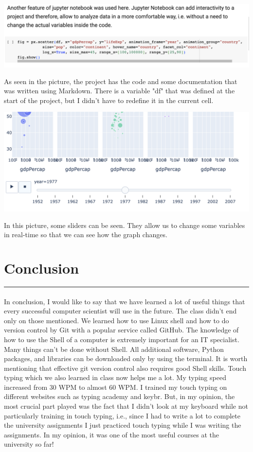 \documentclass[a4paper,11pt]{article}
\newcommand{\sectitle}[1]{
    \vspace{1.5ex}
    \section{#1}
    \vspace{-3ex}
    \noindent\rule{\textwidth}{0.7pt}
    \vspace{-4ex}
}
\begin{document}
\begin{center}
\includegraphics[scale=0.52]{jup1.png}
\end{center}

As seen in the picture, the project has the code and some documentation that was written using Markdown. There is a variable "df" that was defined at the start of the project, but I didn't have to redefine it in the current cell. 

\begin{center}
\includegraphics[scale=0.52]{jup2.png}
\end{center}

In this picture, some sliders can be seen. They allow us to change some variables in real-time so that we can see how the graph changes. 

\sectitle{Conclusion}
\paragraph{}
In conclusion, I would like to say that we have learned a lot of useful things that every successful computer scientist will use in the future. The class didn't end only on those mentioned. We learned how to use Linux shell and how to do version control by Git with a popular service called GitHub. The knowledge of how to use the Shell of a computer is extremely important for an IT specialist. Many things can't be done without Shell. All additional software, Python packages, and libraries can be downloaded only by using the terminal. It is worth mentioning that effective git version control also requires good Shell skills. Touch typing which we also learned in class now helps me a lot. My typing speed increased from 30 WPM to almost 60 WPM. I trained my touch typing on different websites such as typing academy and keybr. But, in my opinion, the most crucial part played was the fact that I didn't look at my keyboard while not particularly training in touch typing, i.e., since I had to write a lot to complete the university assignments I just practiced touch typing while I was writing the assignments. In my opinion, it was one of the most useful courses at the university so far!
\end{document}
